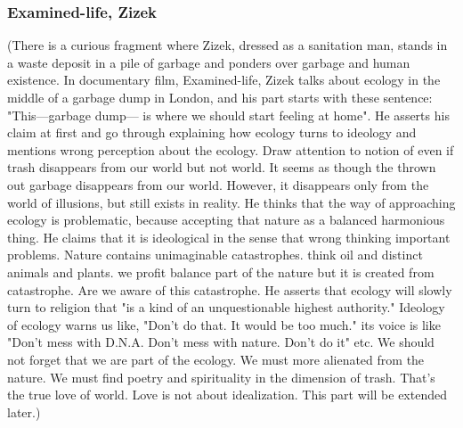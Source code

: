 \subsubsection{Examined-life, Zizek}
(There is a curious fragment where Zizek, dressed as a sanitation man, stands in a waste deposit in a pile of garbage and ponders over garbage and human existence. In documentary film, Examined-life, Zizek talks about ecology in the middle of a garbage dump in London, and his part starts with these sentence: "This---garbage dump--- is where we should start feeling at home". He asserts his claim at first and go through explaining how ecology turns to ideology and mentions wrong perception about the ecology. Draw attention to notion of even if trash disappears from our world but not world. It seems as though the thrown out garbage disappears from
our world. However, it disappears only from the world of illusions, but still exists in reality. He thinks that the way of approaching ecology is problematic, because accepting that nature as a balanced harmonious thing. He claims that it is ideological in the sense that wrong thinking important problems. Nature contains unimaginable catastrophes. think oil and distinct animals and plants. we profit balance part of the nature but it is created from catastrophe. Are we aware of this catastrophe. He asserts that ecology will slowly turn to religion that "is a kind of an unquestionable highest authority." Ideology of ecology warns us like, "Don't do that. It would be too much." its voice is like "Don't mess with D.N.A. Don't mess with nature. Don't do it" etc. We should not forget that we are part of the ecology. We must more alienated from the nature. We must find poetry and spirituality in the dimension of trash. That's the true love of world. Love is not about idealization. This part will be extended later.)

 \cite{vafin2012zizek}

